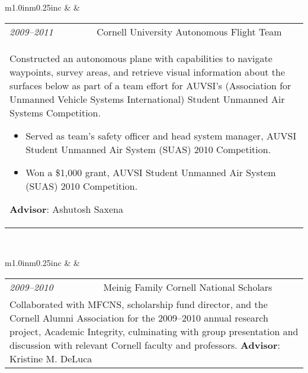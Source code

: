 \documentclass[11pt]{article}
\begin{document}
\begin{tabular}{m{1.0in}m{0.25in}c}
 & & 
\begin{tabular}{m{0.85in}m{0.15in}m{3.75in}}
\textit{\small{2009--2011}} & & Cornell University Autonomous Flight Team \\ \multicolumn{3}{p{4.75in}}{\footnotesize{Constructed an autonomous plane with capabilities to navigate waypoints, survey areas, and retrieve visual information about the surfaces below as part of a team effort for AUVSI's (Association for Unmanned Vehicle Systems International) Student Unmanned Air Systems Competition. \noindent\begin{itemize}[leftmargin=*] \item Served as \textcolor{NavyBlue}{team's safety officer} and \textcolor{NavyBlue}{head system manager}, AUVSI Student Unmanned Air System (SUAS) 2010 Competition. \item \textcolor{NavyBlue}{Won a \$1,000 grant}, AUVSI Student Unmanned Air System (SUAS) 2010 Competition. \end{itemize} \textbf{Advisor}: Ashutosh Saxena}} 
\end{tabular} \\ 
\end{tabular}

\vspace{0.25cm}

\begin{tabular}{m{1.0in}m{0.25in}c}
 & & 
\begin{tabular}{m{0.85in}m{0.15in}m{3.75in}}
\textit{\small{2009--2010}} & & Meinig Family Cornell National Scholars \\ \multicolumn{3}{p{4.75in}}{\footnotesize{Collaborated with MFCNS, scholarship fund director, and the Cornell Alumni Association for the 2009--2010 annual research project, Academic Integrity, culminating with group presentation and discussion with relevant Cornell faculty and professors. \newline \textbf{Advisor}: Kristine M. DeLuca}} 
\end{tabular} \\ 
\end{tabular}

\vspace{0.5cm}

\noindent\hspace{0cm}\textcolor{black}{\textsc{}}
\end{document}
